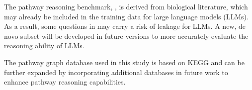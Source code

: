 The pathway reasoning benchmark, \benchname, is derived from biological literature, which may already be included in the training data for large language models (LLMs). As a result, some questions in \benchname may carry a risk of leakage for LLMs. A new, de novo subset will be developed in future versions to more accurately evaluate the reasoning ability of LLMs.

The pathway graph database used in this study is based on KEGG and can be further expanded by incorporating additional databases in future work to enhance pathway reasoning capabilities.